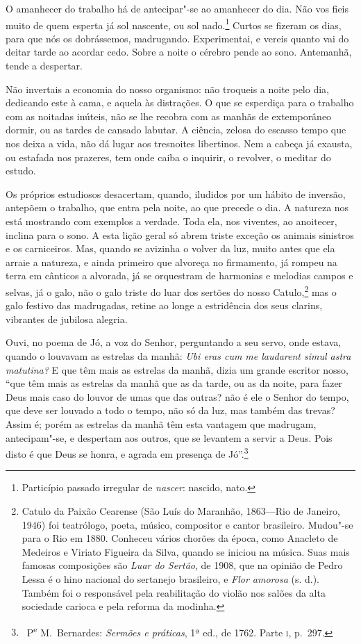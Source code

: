 O amanhecer do trabalho há de antecipar"-se ao amanhecer do dia.
Não vos fieis muito de quem esperta já sol nascente, ou sol
nado.\footnote{ Particípio passado irregular de \textit{nascer}:
nascido, nato.} Curtos se fizeram os dias, para que nós os
dobrássemos, madrugando. Experimentai, e vereis quanto vai do deitar
tarde ao acordar cedo. Sobre a noite o cérebro pende ao sono.
Antemanhã, tende a despertar.

Não invertais a economia do nosso organismo: não troqueis a noite
pelo dia, dedicando este à cama, e aquela às distrações. O que se
esperdiça para o trabalho com as noitadas inúteis, não se lhe recobra
com as manhãs de extemporâneo dormir, ou as tardes de cansado labutar.
A ciência, zelosa do escasso tempo que nos deixa a vida, não dá lugar
aos tresnoites libertinos. Nem a cabeça já exausta, ou estafada nos
prazeres, tem onde caiba o inquirir, o revolver, o meditar do estudo.

Os próprios estudiosos desacertam, quando, iludidos por um hábito
de inversão, antepõem o trabalho, que entra pela noite, ao que precede
o dia. A natureza nos está mostrando com exemplos a verdade. Toda ela,
nos viventes, ao anoitecer, inclina para o sono. A esta lição geral só
abrem triste exceção os animais sinistros e os carniceiros. Mas, quando
se avizinha o volver da luz, muito antes que ela arraie a natureza, e
ainda primeiro que alvoreça no firmamento, já rompeu na terra em
cânticos a alvorada, já se orquestram de harmonias e melodias campos e
selvas, já o galo, não o galo triste do luar dos sertões do nosso
Catulo,\footnote{ Catulo da Paixão Cearense (São
Luís do Maranhão, 1863---Rio de Janeiro, 1946) foi
teatrólogo, poeta, músico, compositor e
cantor brasileiro. Mudou"-se para o Rio em 1880. Conheceu vários
chorões  da época, como Anacleto de Medeiros  e
Viriato Figueira da Silva, quando se iniciou na
música. Suas mais famosas composições são \textit{Luar
do Sertão}, de 1908, que na opinião de Pedro Lessa  
é o hino nacional do sertanejo brasileiro, e 
\textit{Flor amorosa} (s. d.). Também foi o
responsável pela reabilitação do violão nos salões da alta sociedade
carioca e pela reforma da modinha.} mas o galo festivo das
madrugadas, retine ao longe a estridência dos seus clarins, 
vibrantes de jubilosa alegria.

Ouvi, no poema de Jó, a voz do Senhor, perguntando a seu
servo, onde estava, quando o louvavam as estrelas da manhã: \textit{Ubi
eras cum me laudarent simul astra matutina?} E que têm mais as estrelas
da manhã, dizia um grande escritor nosso, ``que têm mais as estrelas da manhã
que as da tarde, ou as da noite, para fazer Deus mais caso do louvor de
umas que das outras? não é ele o Senhor do tempo, que deve ser louvado
a todo o tempo, não só da luz, mas também das trevas? Assim é; porém as
estrelas da manhã têm esta vantagem que madrugam, antecipam"-se, e
despertam aos outros, que se levantem a servir a Deus. Pois disto é que
Deus se honra, e agrada em presença de Jó''.\footnote{\ P\textsuperscript{e} M.~Bernardes: 
\textit{Sermões e práticas}, 1ª ed., de 1762. Parte \textsc{i}, p.~297.}

